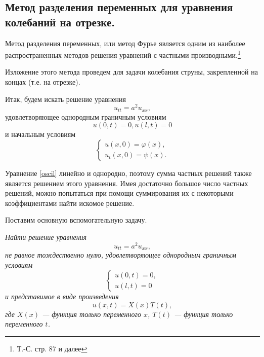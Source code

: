 \subsection{Метод разделения переменных для уравнения колебаний на отрезке.}

Метод разделения переменных, или метод Фурье является одним из наиболее распространенных методов решения уравнений с частными производными.\footnote{Т.-С. стр. 87 и далее}

Изложение этого метода проведем для задачи колебания струны, закрепленной на концах (т.е. на отрезке). 

Итак, будем искать решение уравнения 
\begin{equation} \label{oscil}
	u_{tt} = a^2 u_{xx},
\end{equation}
удовлетворяющее однородным граничным условиям 
\begin{equation} \label{bord_cond}
	u(0, t) = 0, u(l, t) = 0
\end{equation}
и начальным условиям 
\begin{equation} \label{init_cond}
	\begin{cases}
		u(x, 0) = \varphi(x),
		\\
		u_t(x, 0) = \psi(x).
	\end{cases}
\end{equation}

Уравнение \eqref{oscil} линейно и однородно, поэтому сумма частных решений также является решением этого уравнения. Имея достаточно большое число частных решений, можно попытаться при помощи суммирования их с некоторыми коэффициентами найти искомое решение. 

Поставим основную вспомогательную задачу.

\textit{Найти решение уравнения}
\begin{equation*}
	u_{tt} = a^2 u_{xx},
\end{equation*}
\textit{не равное тождественно нулю, удовлетворяющее однородным граничным условиям}
\begin{equation}
	\label{ucond}
	\begin{cases}
		u(0, t) = 0,
		\\
		u(l, t) = 0
	\end{cases}
\end{equation}
\textit{и представимое в виде произведения}
\begin{equation} \label{sol_form}
	u(x, t) = X(x) T(t),
\end{equation}
\textit{где $X(x)$ --- функция только переменного $x$, $T(t)$ --- функция только переменного $t$.}


